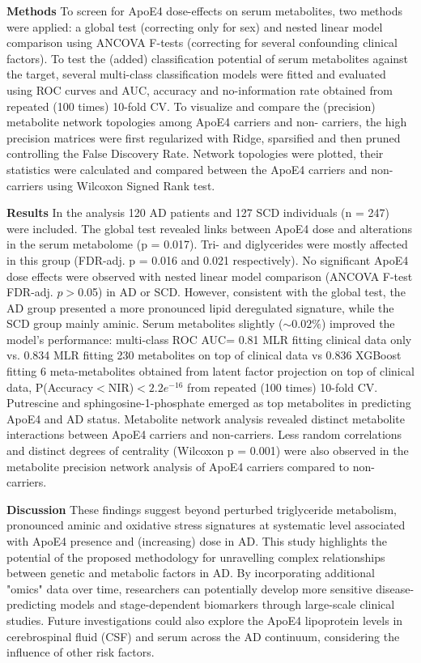 \documentclass{amsart}
\begin{document}
\textbf{Methods}\hspace{.1cm} To screen for ApoE4 dose-effects on serum metabolites, two methods were applied: a global test (correcting only for sex) and nested linear model comparison using ANCOVA F-tests (correcting for several confounding clinical factors). To test the (added) classification potential of serum metabolites against the target, several multi-class classification models were fitted and evaluated using ROC curves and AUC, accuracy and no-information rate obtained from repeated (100 times) 10-fold CV. To visualize and compare the (precision) metabolite network topologies among ApoE4 carriers and non-
carriers, the high precision matrices were first regularized with Ridge, sparsified and then pruned controlling
the False Discovery Rate. Network topologies were plotted, their statistics were calculated and compared
between the ApoE4 carriers and non-carriers using Wilcoxon Signed Rank test.

\textbf{Results}\hspace{.1cm} 
In the analysis 120 AD patients and 127 SCD individuals (n = 247) were included. The global test revealed links between ApoE4 dose and alterations in the serum metabolome (p = 0.017). Tri- and diglycerides were mostly affected in this group (FDR-adj. p = 0.016 and 0.021 respectively). No significant ApoE4 dose effects were observed with nested linear model comparison (ANCOVA F-test FDR-adj. $p >$0.05) in AD or SCD. However, consistent with the global test, the AD group presented a more pronounced lipid deregulated signature, while the SCD group mainly aminic. Serum metabolites slightly ($\sim0.02\%$) improved the model's performance: multi-class ROC AUC= 0.81 MLR fitting clinical data only vs. 0.834 MLR fitting 230 metabolites on top of clinical data vs 0.836 XGBoost fitting 6 meta-metabolites obtained from latent factor projection on top of clinical data, P(Accuracy$<$NIR)$< 2.2e^{-16}$ from repeated (100 times) 10-fold CV. Putrescine and sphingosine-1-phosphate emerged as top metabolites in predicting ApoE4 and AD status. Metabolite network analysis revealed distinct metabolite interactions between ApoE4 carriers and non-carriers. Less random correlations and distinct degrees of centrality (Wilcoxon p = 0.001) were also observed in the metabolite precision network analysis of ApoE4 carriers compared to non-carriers.

\textbf{Discussion}\hspace{.1cm} These findings suggest beyond perturbed triglyceride metabolism, pronounced aminic and oxidative stress signatures at systematic level associated with ApoE4 presence and (increasing) dose in AD. This study highlights the potential of the proposed methodology for unravelling complex relationships between genetic and metabolic factors in AD. By incorporating additional "omics" data over time, researchers can potentially develop more sensitive disease-predicting models and stage-dependent biomarkers through large-scale clinical studies. Future investigations could also explore the ApoE4 lipoprotein levels in cerebrospinal fluid (CSF) and serum across the AD continuum, considering the influence of other risk factors.
\end{document}
